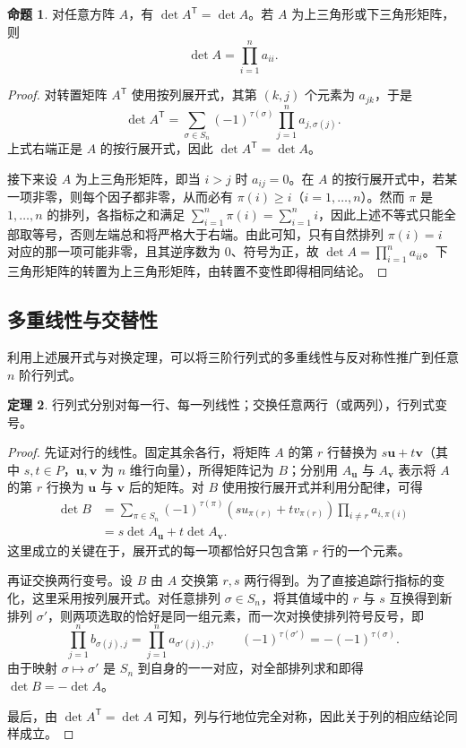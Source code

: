 \documentclass[UTF8, fontset=fandol, a4paper, 12pt]{ctexart}
\theoremstyle{definition}
\newtheorem{theorem}{定理}[section]
\newtheorem{proposition}[theorem]{命题}
\begin{document}
\begin{proposition}
对任意方阵 $A$，有 $\det A^{\mathsf T}=\det A$。若 $A$ 为上三角形或下三角形矩阵，则
\[
  \det A=\prod_{i=1}^{n}a_{ii}.
\]
\end{proposition}
\begin{proof}
对转置矩阵 $A^{\mathsf T}$ 使用按列展开式，其第 $(k,j)$ 个元素为 $a_{jk}$，于是
\[
 \det A^{\mathsf T}
 =\sum_{\sigma\in S_n}(-1)^{\tau(\sigma)}\prod_{j=1}^n a_{j,\sigma(j)}.
\]
上式右端正是 $A$ 的按行展开式，因此 $\det A^{\mathsf T}=\det A$。

接下来设 $A$ 为上三角形矩阵，即当 $i>j$ 时 $a_{ij}=0$。在 $A$ 的按行展开式中，若某一项非零，则每个因子都非零，从而必有 $\pi(i)\ge i$（$i=1,\ldots,n$）。然而 $\pi$ 是 $1,\ldots,n$ 的排列，各指标之和满足 $\sum_{i=1}^n\pi(i)=\sum_{i=1}^n i$，因此上述不等式只能全部取等号，否则左端总和将严格大于右端。由此可知，只有自然排列 $\pi(i)=i$ 对应的那一项可能非零，且其逆序数为 $0$、符号为正，故 $\det A=\prod_{i=1}^n a_{ii}$。下三角形矩阵的转置为上三角形矩阵，由转置不变性即得相同结论。
\end{proof}

\subsection{多重线性与交替性}

利用上述展开式与对换定理，可以将三阶行列式的多重线性与反对称性推广到任意 $n$ 阶行列式。

\begin{theorem}
行列式分别对每一行、每一列线性；交换任意两行（或两列），行列式变号。
\end{theorem}
\begin{proof}
先证对行的线性。固定其余各行，将矩阵 $A$ 的第 $r$ 行替换为 $s\boldsymbol u+t\boldsymbol v$（其中 $s,t\in P$，$\boldsymbol u,\boldsymbol v$ 为 $n$ 维行向量），所得矩阵记为 $B$；分别用 $A_{\boldsymbol u}$ 与 $A_{\boldsymbol v}$ 表示将 $A$ 的第 $r$ 行换为 $\boldsymbol u$ 与 $\boldsymbol v$ 后的矩阵。对 $B$ 使用按行展开式并利用分配律，可得
\begin{align*}
 \det B
 &=\sum_{\pi\in S_n}(-1)^{\tau(\pi)}
   (su_{\pi(r)}+tv_{\pi(r)})\prod_{i\ne r}a_{i,\pi(i)}\\
 &=s\det A_{\boldsymbol u}+t\det A_{\boldsymbol v}.
\end{align*}
这里成立的关键在于，展开式的每一项都恰好只包含第 $r$ 行的一个元素。

再证交换两行变号。设 $B$ 由 $A$ 交换第 $r,s$ 两行得到。为了直接追踪行指标的变化，这里采用按列展开式。对任意排列 $\sigma\in S_n$，将其值域中的 $r$ 与 $s$ 互换得到新排列 $\sigma'$，则两项选取的恰好是同一组元素，而一次对换使排列符号反号，即
\[
 \prod_{j=1}^n b_{\sigma(j),j}=\prod_{j=1}^n a_{\sigma'(j),j},
 \qquad (-1)^{\tau(\sigma')}=-(-1)^{\tau(\sigma)}.
\]
由于映射 $\sigma\mapsto\sigma'$ 是 $S_n$ 到自身的一一对应，对全部排列求和即得 $\det B=-\det A$。

最后，由 $\det A^{\mathsf T}=\det A$ 可知，列与行地位完全对称，因此关于列的相应结论同样成立。
\end{proof}
\end{document}
